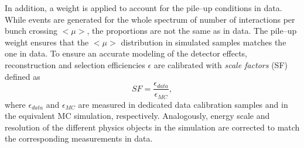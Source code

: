 In addition, a weight is applied  to account for the pile--up
conditions in data. While events are generated for the whole spectrum
of number of interactions per bunch crossing $<\mu>$, the proportions
are not the same as in data. The pile--up weight ensures that the
$<\mu>$ distribution in simulated samples matches the one in data.
To ensure an accurate modeling of the detector effects, reconstruction
and selection efficiencies $\epsilon$ are calibrated with {\it scale factors}
(SF) defined as 
\begin{equation}
SF = \frac{\epsilon_{data}}{\epsilon_{MC}},
\end{equation}
where $\epsilon_{data}$ and $\epsilon_{MC}$ are measured in dedicated
data calibration samples and in the equivalent MC simulation, respectively.
Analogously, energy scale and resolution of the different physics
objects in the simulation are corrected to match the corresponding
measurements in data.
